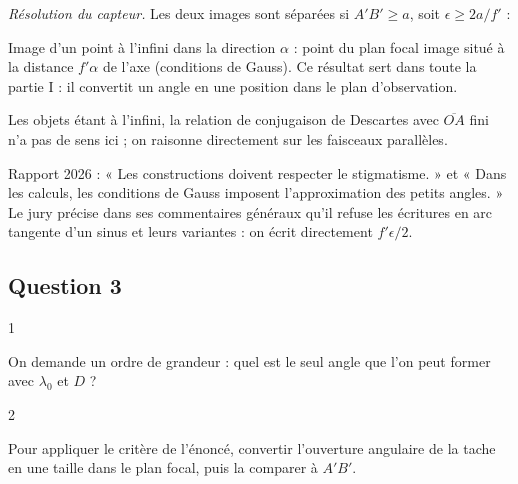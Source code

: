 \documentclass[11pt,a4paper]{article}
\newcommand{\equationajustee}[1]{%
  \sbox{\boiteequation}{$\displaystyle #1$}%
  \ifdim\wd\boiteequation>\linewidth
    \[\resizebox{\linewidth}{!}{\usebox{\boiteequation}}\]%
  \else
    \[#1\]%
  \fi}
\begin{document}
\equationajustee{\boxed{A'B'=\frac{f'\epsilon}{2}}}

\emph{Résolution du capteur.} Les deux images sont séparées si \(A'B'\geqslant a\), soit \(\epsilon\geqslant2a/f'\) :

\equationajustee{\boxed{r_{\rm cap}=\frac{2a}{f'}}}

\begin{methode}

Image d'un point à l'infini dans la direction \(\alpha\) : point du plan focal image situé à la distance \(f'\alpha\) de l'axe (conditions de Gauss). Ce résultat sert dans toute la partie I : il convertit un angle en une position dans le plan d'observation.

\end{methode}

\begin{piege}

Les objets étant à l'infini, la relation de conjugaison de Descartes avec \(\overline{OA}\) fini n'a pas de sens ici ; on raisonne directement sur les faisceaux parallèles.

\end{piege}

\begin{jury}

Rapport 2026 : « Les constructions doivent respecter le stigmatisme. » et « Dans les calculs, les conditions de Gauss imposent l'approximation des petits angles. » Le jury précise dans ses commentaires généraux qu'il refuse les écritures en arc tangente d'un sinus et leurs variantes : on écrit directement \(f'\epsilon/2\).

\end{jury}

\hypertarget{question-3}{%
\subsection{Question 3}\label{question-3}}

\begin{indication}{1}

On demande un ordre de grandeur : quel est le seul angle que l'on peut former avec \(\lambda_0\) et \(D\) ?

\end{indication}

\begin{indication}{2}

Pour appliquer le critère de l'énoncé, convertir l'ouverture angulaire de la tache en une taille dans le plan focal, puis la comparer à \(A'B'\).

\end{indication}
\end{document}
